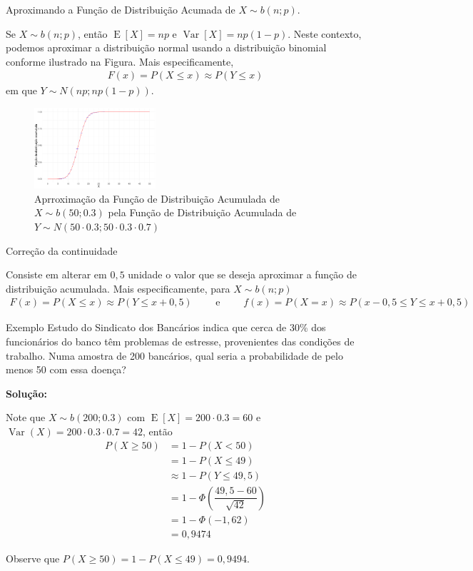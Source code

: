 \documentclass[9pt]{beamer}
\DeclareMathOperator{\espe}{E}
\DeclareMathOperator{\vari}{Var}
\begin{document}
\begin{frame}{Aproximando a Função de Distribuição Acumada de $X \sim b(n; p)$.}

{\scriptsize
 Se $X \sim b(n; p)$, então $\espe [X] =np$ e $\vari [X] = n p (1-p)$. Neste contexto, podemos aproximar a distribuição normal usando a distribuição binomial conforme ilustrado na Figura. Mais especificamente,
 \begin{align*}
  F(x) = P(X \leq x) \approx P( Y \leq x) 
 \end{align*}
 em que $Y \sim N(n p; n  p (1-p))$.
} 
 
 \begin{figure}
  \centering
  \caption{\scriptsize Aprroximação da Função de Distribuição Acumulada de $X \sim b(50; 0.3)$ pela Função de Distribuição Acumulada de $Y \sim N(50\cdot 0.3; 50\cdot 0.3 \cdot 0.7)$}
  \includegraphics[width = 4.5cm]{figure/aproximacao.pdf}
 \end{figure}

\begin{block}{Correção da continuidade}
 {\scriptsize
  Consiste em alterar em $0,5$ unidade o valor que se deseja aproximar a função de distribuição acumulada. Mais especificamente, para $X \sim b(n; p)$
  \begin{align*}
   F(x) = P(X \leq x) \approx P( Y \leq x + 0,5) \qquad \mbox{ e } \qquad
   f(x) = P(X = x) \approx P(x - 0,5 \leq Y \leq x +0,5)
  \end{align*}

 }
\end{block}

\end{frame}

\begin{frame} {Exemplo}
 Estudo do Sindicato dos Bancários indica que cerca de 30\% dos funcionários do banco têm problemas de estresse, provenientes das condições de trabalho. Numa amostra de 200 bancários, qual seria a probabilidade de pelo menos 50 com essa doença?
 \vfill
 
 \textbf{Solução:}
 
 Note que $X \sim b(200; 0.3)$ com $\espe[X] = 200\cdot 0.3 = 60$ e $\vari(X) = 200\cdot 0.3 \cdot 0.7 = 42$, então
 \begin{align*}
  P(X \geq 50) &= 1 - P(X < 50) \\
  &= 1 - P(X \leq 49)\\
  &\approx 1 - P(Y \leq 49,5)\\
  &= 1 - \Phi\left( \dfrac{49,5 - 60}{\sqrt{42}} \right)\\
  &= 1 - \Phi(-1,62)\\
  &= 0,9474
 \end{align*}

 Observe que $P(X \geq 50) = 1 - P(X \leq 49) = 0,9494$.
\end{frame}
\end{document}
